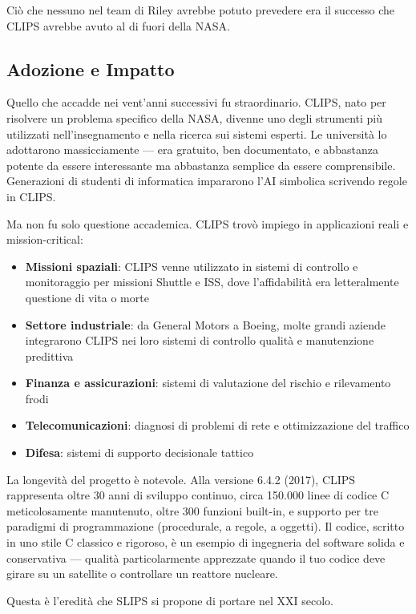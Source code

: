 Ciò che nessuno nel team di Riley avrebbe potuto prevedere era il successo che CLIPS avrebbe avuto al di fuori della NASA.

\subsection{Adozione e Impatto}

Quello che accadde nei vent'anni successivi fu straordinario. CLIPS, nato per risolvere un problema specifico della NASA, divenne uno degli strumenti più utilizzati nell'insegnamento e nella ricerca sui sistemi esperti. Le università lo adottarono massicciamente — era gratuito, ben documentato, e abbastanza potente da essere interessante ma abbastanza semplice da essere comprensibile. Generazioni di studenti di informatica impararono l'AI simbolica scrivendo regole in CLIPS.

Ma non fu solo questione accademica. CLIPS trovò impiego in applicazioni reali e mission-critical:

\begin{itemize}
\item \textbf{Missioni spaziali}: CLIPS venne utilizzato in sistemi di controllo e monitoraggio per missioni Shuttle e ISS, dove l'affidabilità era letteralmente questione di vita o morte
\item \textbf{Settore industriale}: da General Motors a Boeing, molte grandi aziende integrarono CLIPS nei loro sistemi di controllo qualità e manutenzione predittiva
\item \textbf{Finanza e assicurazioni}: sistemi di valutazione del rischio e rilevamento frodi
\item \textbf{Telecomunicazioni}: diagnosi di problemi di rete e ottimizzazione del traffico
\item \textbf{Difesa}: sistemi di supporto decisionale tattico
\end{itemize}

La longevità del progetto è notevole. Alla versione 6.4.2 (2017), CLIPS rappresenta oltre 30 anni di sviluppo continuo, circa 150.000 linee di codice C meticolosamente manutenuto, oltre 300 funzioni built-in, e supporto per tre paradigmi di programmazione (procedurale, a regole, a oggetti). Il codice, scritto in uno stile C classico e rigoroso, è un esempio di ingegneria del software solida e conservativa — qualità particolarmente apprezzate quando il tuo codice deve girare su un satellite o controllare un reattore nucleare.

Questa è l'eredità che SLIPS si propone di portare nel XXI secolo.

